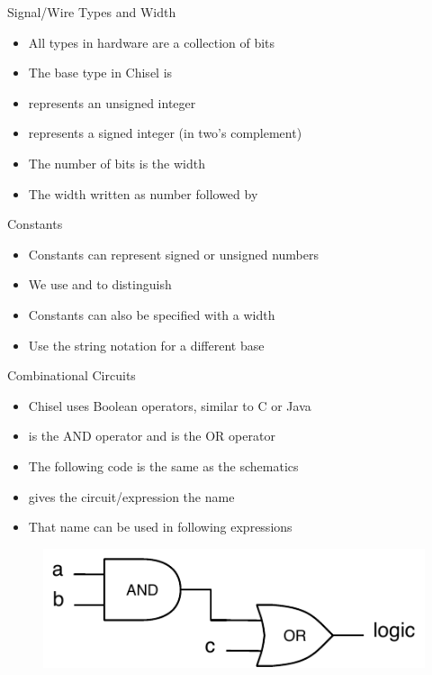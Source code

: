 \begin{frame}[fragile]{Signal/Wire Types and Width}
\begin{itemize}
\item All types in hardware are a collection of bits
\item The base type in Chisel is 
\item {} represents an unsigned integer
\item {} represents a signed integer (in two's complement)
\item The number of bits is the width
\item The width written as number followed by 
\end{itemize}
\end{frame}

\begin{frame}[fragile]{Constants}
\begin{itemize}
\item Constants can represent signed or unsigned numbers
\item We use  and  to distinguish
\end{itemize}
\begin{itemize}
\item Constants can also be specified with a width
\end{itemize}
\begin{itemize}
\item Use the string notation for a different base
\end{itemize}
\end{frame}

\begin{frame}[fragile]{Combinational Circuits}
\begin{itemize}
\item Chisel uses Boolean operators, similar to C or Java
\item \code{\&} is the AND operator and \code{|} is the OR operator
\item The following code is the same as the schematics
\item {} gives the circuit/expression the name 
\item That name can be used in following expressions
\end{itemize}
\begin{figure}
  \includegraphics[scale=\scale]{../figures/logic}
\end{figure}
\end{frame}


